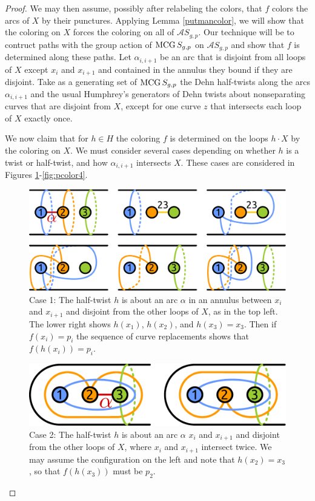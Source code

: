 \begin{proof}
  We may then assume, possibly after relabeling the colors,
  that $f$ colors the arcs of $X$ by their punctures.
  Applying Lemma \ref{putmancolor},
  we will show that the coloring on $X$ forces
  the coloring on all of $\mathcal A S_{g,p}$.
  Our technique will be to contruct paths with the group action
  of $\operatorname{MCG} S_{g,p}$ on $\mathcal A S_{g,p}$
  and show that $f$ is determined along these paths.
  Let $\alpha_{i,i+1}$ be an arc that is disjoint from
  all loops of $X$ except $x_i$ and $x_{i+1}$
  and contained in the annulus they bound if they are disjoint.
  Take as a generating set of $\operatorname{MCG} S_{g,p}$
  the Dehn half-twists along the arcs $\alpha_{i,i+1}$
  and the usual Humphrey's generators
  of Dehn twists about nonseparating curves
  that are disjoint from $X$, except for one curve $z$
  that intersects each loop of $X$ exactly once.

  We now claim that for $h \in H$ the
  coloring $f$ is determined on the loops $h\cdot X$
  by the coloring on $X$.
  We must consider several cases
  depending on whether $h$ is a twist or half-twist,
  and how $\alpha_{i,i+1}$ intersects $X$.
  These cases are considered in Figures \ref{fig:pcolor1}-\ref{fig:pcolor4}.
    \begin{figure}[h!]
      \includegraphics[width=.8\textwidth]{figures/pcolorsequence1.pdf}
      \caption{Case 1: The half-twist $h$ is about an arc $\alpha$
      in an annulus between $x_i$ and $x_{i+1}$ and disjoint from the other loops of $X$,
      as in the top left.
      The lower right shows $h(x_1)$, $h(x_2)$, and $h(x_3)=x_3$.
      Then if $f(x_i)=p_i$ the sequence of curve replacements shows
      that $f(h(x_i))=p_i$.
      }
      \label{fig:pcolor1}
    \end{figure}
    \begin{figure}[h!]
      \includegraphics[width=.6\textwidth]{figures/pcolorsequence2.pdf}
      \caption{Case 2: The half-twist $h$ is about an arc $\alpha$
      $x_i$ and $x_{i+1}$ and disjoint from the other loops of $X$,
      where $x_i$ and $x_{i+1}$ intersect twice.
      We may assume the configuration on the left and note that
      $h(x_2)=x_3$, so that $f(h(x_3))$ must be $p_2$.}
      \label{fig:pcolor2}
    \end{figure}



\end{proof}
